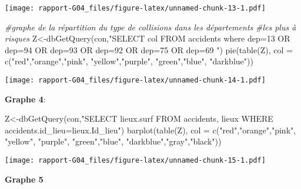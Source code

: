 \documentclass[mstat,12pt]{unswthesis}
\newenvironment{Shaded}{\begin{snugshade}}{\end{snugshade}}
\newcommand{\AttributeTok}[1]{\textcolor[rgb]{0.77,0.63,0.00}{#1}}
\newcommand{\CommentTok}[1]{\textcolor[rgb]{0.56,0.35,0.01}{\textit{#1}}}
\newcommand{\FunctionTok}[1]{\textcolor[rgb]{0.00,0.00,0.00}{#1}}
\newcommand{\NormalTok}[1]{#1}
\newcommand{\OtherTok}[1]{\textcolor[rgb]{0.56,0.35,0.01}{#1}}
\newcommand{\StringTok}[1]{\textcolor[rgb]{0.31,0.60,0.02}{#1}}
\begin{document}
\texttt{[image: rapport-G04\_files/figure-latex/unnamed-chunk-13-1.pdf]}

\begin{Shaded}
\begin{Highlighting}[]
\CommentTok{\#graphe de la répartition du type de collisions dans les départements }
\CommentTok{\#les plus à risques}
\NormalTok{Z}\OtherTok{\textless{}{-}}\FunctionTok{dbGetQuery}\NormalTok{(con,}\StringTok{"SELECT col}
\StringTok{FROM accidents}
\StringTok{where dep=13 OR dep=94 OR dep=93 OR dep=92 OR dep=75 OR dep=69}
\StringTok{"}\NormalTok{)}
\FunctionTok{pie}\NormalTok{(}\FunctionTok{table}\NormalTok{(Z), }\AttributeTok{col =} \FunctionTok{c}\NormalTok{(}\StringTok{"red"}\NormalTok{,}\StringTok{"orange"}\NormalTok{,}\StringTok{"pink"}\NormalTok{, }\StringTok{"yellow"}\NormalTok{,}\StringTok{"purple"}\NormalTok{,}
                      \StringTok{"green"}\NormalTok{,}\StringTok{"blue"}\NormalTok{, }\StringTok{"darkblue"}\NormalTok{))}
\end{Highlighting}
\end{Shaded}

\texttt{[image: rapport-G04\_files/figure-latex/unnamed-chunk-14-1.pdf]}

\medskip

\textbf{Graphe 4}:

\begin{Shaded}
\begin{Highlighting}[]
\NormalTok{Z}\OtherTok{\textless{}{-}}\FunctionTok{dbGetQuery}\NormalTok{(con,}\StringTok{"SELECT lieux.surf FROM accidents,}
\StringTok{              lieux WHERE accidents.id\_lieu=lieux.Id\_lieu"}\NormalTok{)}
\FunctionTok{barplot}\NormalTok{(}\FunctionTok{table}\NormalTok{(Z), }\AttributeTok{col =} \FunctionTok{c}\NormalTok{(}\StringTok{"red"}\NormalTok{,}\StringTok{"orange"}\NormalTok{,}\StringTok{"pink"}\NormalTok{, }\StringTok{"yellow"}\NormalTok{,}
                          \StringTok{"purple"}\NormalTok{, }\StringTok{"green"}\NormalTok{,}\StringTok{"blue"}\NormalTok{, }\StringTok{"darkblue"}\NormalTok{,}\StringTok{"gray"}\NormalTok{,}\StringTok{"black"}\NormalTok{))}
\end{Highlighting}
\end{Shaded}

\texttt{[image: rapport-G04\_files/figure-latex/unnamed-chunk-15-1.pdf]}

\medskip

\textbf{Graphe 5 }
\end{document}
